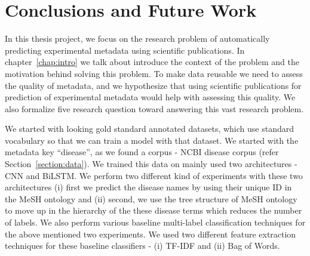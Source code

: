 \chapter{Conclusions and Future Work}\label{conclusion chapter}


In this thesis project, we focus on the research problem of automatically predicting experimental metadata using scientific publications. In chapter~\ref{chap:intro} we talk about introduce the context of the problem and the motivation behind solving this problem. To make data reusable we need to assess the quality of metadata, and we hypothesize that using scientific publications for prediction of experimental metadata would help with assessing this quality. We also formalize five research question toward answering this vast research problem. 

We started with looking gold standard annotated datasets, which use standard vocabulary so that we can train a model with that dataset. We started with the metadata key ``disease'', as we found a corpus - NCBI disease corpus (refer Section~\ref{section:data}). We trained this data on mainly used two architectures - CNN and BiLSTM. We perform two different kind of experiments with these two architectures (i) first we predict the disease names by using their unique ID in the MeSH ontology and (ii) second, we use the tree structure of MeSH ontology to move up in the hierarchy of the these disease terms which reduces the number of labels. We also perform various baseline multi-label classification techniques for the above mentioned two experiments. We used two different feature extraction techniques for these baseline classifiers - (i) TF-IDF and  (ii) Bag of Words. 

